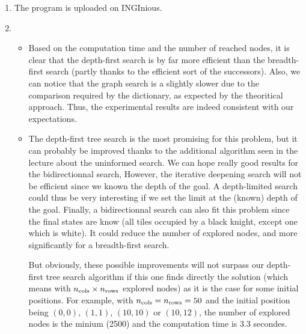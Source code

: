 \documentclass[a4paper,10pt]{article}
\begin{document}
\begin{enumerate}
 \item The program is uploaded on INGInious.
 \item 
 \begin{itemize}
  \item Based on the computation time and the number of reached nodes, it is clear that the depth-first search is by far more efficient than the breadth-first search (partly thanks to the efficient sort of the successors). Also, we can notice that the graph search is a slightly slower due to the comparison required by the dictionary, as expected by the theoritical approach. Thus, the experimental results are indeed consistent with our expectations.
  \item The depth-first tree search is the most promising for this problem, but it can probably be improved thanks to the additional algorithm seen in the lecture about the uninformed search. We can hope really good results for the bidirectionnal search, However, the iterative deepening search will not be efficient since we known the depth of the goal. A depth-limited search could thus be very interesting if we set the limit at the (known) depth of the goal. Finally, a bidirectionnal search can also fit this problem since the final states are know (all tiles occupied by a black knight, except one which is white). It could reduce the number of explored nodes, and more significantly for a breadth-first search. 
  
  But obviously, these possible improvements will not surpass our depth-first tree search algorithm if this one finds directly the solution (which means with $n_{\textnormal{cols}} \times n_{\vphantom{l}\textnormal{rows}}$ explored nodes) as it is the case for some initial positions. For example, with $n_{\textnormal{cols}}=n_{\vphantom{l}\textnormal{rows}}=50$ and the initial position being $(0,0)$, $(1,1)$, $(10,10)$ or $(10,12)$, the number of explored nodes is the minium (2500) and the computation time is 3.3 secondes.
 \end{itemize}

\end{enumerate}
\end{document}
